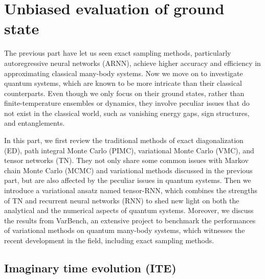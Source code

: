 \chapter{Unbiased evaluation of ground state}

The previous part have let us seen exact sampling methods, particularly autoregressive neural networks (ARNN), achieve higher accuracy and efficiency in approximating classical many-body systems. Now we move on to investigate quantum systems, which are known to be more intricate than their classical counterparts. Even though we only focus on their ground states, rather than finite-temperature ensembles or dynamics, they involve peculiar issues that do not exist in the classical world, such as vanishing energy gaps, sign structures, and entanglements.

In this part, we first review the traditional methods of exact diagonalization (ED), path integral Monte Carlo (PIMC), variational Monte Carlo (VMC), and tensor networks (TN). They not only share some common issues with Markov chain Monte Carlo (MCMC) and variational methods discussed in the previous part, but are also affected by the peculiar issues in quantum systems. Then we introduce a variational ansatz named tensor-RNN, which combines the strengths of TN and recurrent neural networks (RNN) to shed new light on both the analytical and the numerical aspects of quantum systems. Moreover, we discuss the results from VarBench, an extensive project to benchmark the performances of variational methods on quantum many-body systems, which witnesses the recent development in the field, including exact sampling methods.

\section{Imaginary time evolution (ITE)}
\label{sec:ite}

